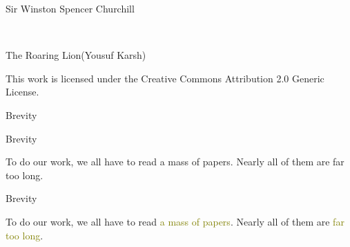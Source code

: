 \documentclass[
  ignorenonframetext,
]{beamer}
\begin{document}
\begin{frame}{Sir Winston Spencer Churchill}
\protect\hypertarget{sir-winston-spencer-churchill-1}{}
\raggedleft\Huge


\tiny

\raggedleft

The Roaring Lion(Yousuf Karsh) \vspace{-5pt}

This work is licensed under the Creative Commons Attribution 2.0 Generic
License.
\end{frame}

\begin{frame}{Brevity}
\protect\hypertarget{brevity}{}
\centering
\vspace*{-21.5pt}
\end{frame}

\begin{frame}{Brevity}
\protect\hypertarget{brevity-1}{}
\Large

To do our work, we all have to read a mass of papers. Nearly all of them
are far too long.

\par

\vfill
\Huge


\vfill
\end{frame}

\begin{frame}{Brevity}
\protect\hypertarget{brevity-2}{}
\Large

To do our work, we all have to read \textcolor{olive}{a mass of papers}.
Nearly all of them are \textcolor{olive}{far too long}.

\par

\vfill
\Huge


\vfill
\end{frame}
\end{document}
